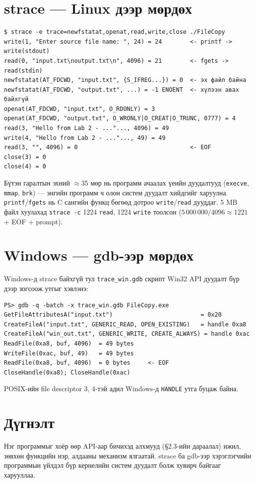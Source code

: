 \documentclass[12pt,a4paper]{article}
\begin{document}
\section{strace — Linux дээр мөрдөх}
\begin{Verbatim}
$ strace -e trace=newfstatat,openat,read,write,close ./FileCopy
write(1, "Enter source file name: ", 24) = 24        <- printf -> write(stdout)
read(0, "input.txt\noutput.txt\n", 4096) = 21        <- fgets -> read(stdin)
newfstatat(AT_FDCWD, "input.txt", {S_IFREG...}) = 0  <- эх файл байна
newfstatat(AT_FDCWD, "output.txt", ...) = -1 ENOENT  <- хүлээн авах байхгүй
openat(AT_FDCWD, "input.txt", O_RDONLY) = 3
openat(AT_FDCWD, "output.txt", O_WRONLY|O_CREAT|O_TRUNC, 0777) = 4
read(3, "Hello from Lab 2 - ..."..., 4096) = 49
write(4, "Hello from Lab 2 - ..."..., 49) = 49
read(3, "", 4096) = 0                                <- EOF
close(3) = 0
close(4) = 0
\end{Verbatim}
Бүтэн гаралтын эхний $\approx$35 мөр нь программ ачаалах үеийн дуудалтууд (\texttt{execve}, \texttt{mmap}, \texttt{brk}) — энгийн программ ч олон систем дуудалт хийдгийг харуулна. \texttt{printf}/\texttt{fgets} нь C сангийн функц бөгөөд дотроо \texttt{write}/\texttt{read} дууддаг. 5 MB файл хуулахад \texttt{strace -c} 1224 \texttt{read}, 1224 \texttt{write} тоолсон ($5\,000\,000 / 4096 \approx 1221$ + EOF + prompt).

\section{Windows — gdb-ээр мөрдөх}
Windows-д strace байхгүй тул \texttt{trace\_win.gdb} скрипт Win32 API дуудалт бүр дээр зогсоож утгыг хэвлэнэ:
\begin{Verbatim}
PS> gdb -q -batch -x trace_win.gdb FileCopy.exe
GetFileAttributesA("input.txt")                         = 0x20
CreateFileA("input.txt", GENERIC_READ, OPEN_EXISTING)   = handle 0xa8
CreateFileA("win_out.txt", GENERIC_WRITE, CREATE_ALWAYS) = handle 0xac
ReadFile(0xa8, buf, 4096)  = 49 bytes
WriteFile(0xac, buf, 49)   = 49 bytes
ReadFile(0xa8, buf, 4096)  = 0 bytes     <- EOF
CloseHandle(0xa8); CloseHandle(0xac)
\end{Verbatim}
POSIX-ийн file descriptor 3, 4-тэй адил Windows-д \texttt{HANDLE} утга буцаж байна.

\section{Дүгнэлт}
Нэг программыг хоёр өөр API-аар бичихэд алхмууд (§2.3-ийн дараалал) ижил, зөвхөн функцийн нэр, алдааны механизм ялгаатай. strace ба gdb-ээр хэрэглэгчийн программын үйлдэл бүр кернелийн систем дуудалт болж хувирч байгааг харууллаа.
\end{document}
